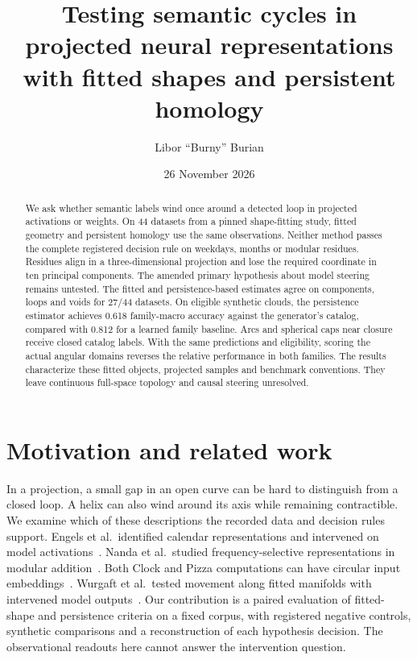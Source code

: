 \documentclass[10pt]{article}
\title{Testing semantic cycles in projected neural representations\\with fitted shapes and persistent homology}
\author{Libor \textquotedblleft Burny\textquotedblright{} Burian}
\date{26 November 2026}
\begin{document}
\maketitle

\begin{abstract}
We ask whether semantic labels wind once around a detected loop in projected activations or weights. On 44 datasets from a pinned shape-fitting study, fitted geometry and persistent homology use the same observations. Neither method passes the complete registered decision rule on weekdays, months or modular residues. Residues align in a three-dimensional projection and lose the required coordinate in ten principal components. The amended primary hypothesis about model steering remains untested. The fitted and persistence-based estimates agree on components, loops and voids for 27/44 datasets. On eligible synthetic clouds, the persistence estimator achieves 0.618 family-macro accuracy against the generator's catalog, compared with 0.812 for a learned family baseline. Arcs and spherical caps near closure receive closed catalog labels. With the same predictions and eligibility, scoring the actual angular domains reverses the relative performance in both families. The results characterize these fitted objects, projected samples and benchmark conventions. They leave continuous full-space topology and causal steering unresolved.
\end{abstract}

\section{Motivation and related work}

In a projection, a small gap in an open curve can be hard to distinguish from a closed loop. A helix can also wind around its axis while remaining contractible. We examine which of these descriptions the recorded data and decision rules support. Engels et al.\ identified calendar representations and intervened on model activations~\citep{engels2025notall}. Nanda et al.\ studied frequency-selective representations in modular addition~\citep{nanda2023progress}. Both Clock and Pizza computations can have circular input embeddings~\citep{zhong2023}. Wurgaft et al.\ tested movement along fitted manifolds with intervened model outputs~\citep{wurgaft2026manifold}. Our contribution is a paired evaluation of fitted-shape and persistence criteria on a fixed corpus, with registered negative controls, synthetic comparisons and a reconstruction of each hypothesis decision. The observational readouts here cannot answer the intervention question.
\end{document}
